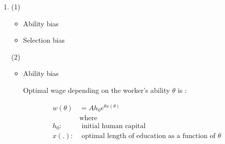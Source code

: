 \documentclass{jsarticle}
\begin{document}
\begin{enumerate}
 where $R_0 = w (l + h_D + h_M) + R$.
 
 (2)
 
 By the assumption, $l > 0$ and $h_M >0$,
 
  \begin{align*}
  \dfrac{\partial u}{\partial l} &= 0 \\
  \dfrac{\partial u}{\partial C} & = 0 \\
  \end{align*} 
 
 holds. Then, assume u(.) is monotonic in $l$, 
 
 \[0 < \frac{\partial u}{\partial l} \leq \lambda \]
 
 which indicates that
 
 \[ R_0 + [f(h_D) - w h_D - C - wl] = 0 \]
 
 and
 
 \[ f'(h_D) - w  = 0 \]
 
 Deriving marginal rate of substitution, 
 
 \[ \textit{MRS} \equiv \dfrac{\partial u / \partial l}{\partial u / \partial C} 
 = \dfrac{\lambda w}{\lambda} = w \]
 
 First, by $f'(h_D) - w  = 0$,  optimal $h_D$ is determined, and then, $R_0 + [f(h_D) - w h_D - C - wl] = 0$ and $\textit{MRS} = w$ yields the optimal $h_M$ and $l$.
 
 (3)
 
 By the assumption $h_M = 0$,
 
  \begin{align*}
  L_0 &= l + h_M \\
  R_0 &= 
  \end{align*}
 
 \item
 
 (1) 
  \begin{itemize}
  
  \item Ability bias
  
  \item Selection bias
  
  \end{itemize}
 
 (2) 
  \begin{itemize}
  
  \item Ability bias
  
  Optimal wage depending on the worker's ability $\theta$ is : 
  
   \begin{align*}
   w(\theta) & = A h_0 e^{\theta x(\theta)} \\
   & \text{where } \\
   h_0 : & \text{ initial human capital} \\
   x(.) : & \text{ optimal length of education as a function of } \theta
   \end{align*}
  

\end{itemize}
\end{enumerate}
\end{document}
